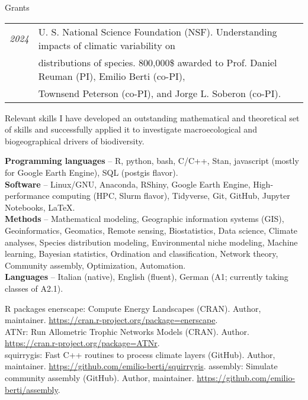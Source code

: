 \documentclass{resume} %
\begin{document}
\begin{rSection}{Grants}
\begin{tabular}{l l}
{\em 2024} & U. S. National Science Foundation (NSF). Understanding impacts of climatic variability on\\
           & distributions of species. 800,000\$ awarded to Prof. Daniel Reuman (PI), Emilio Berti (co-PI),\\
           & Townsend Peterson (co-PI), and Jorge L. Soberon (co-PI).
\end{tabular}
\end{rSection}

\begin{rSection}{Relevant skills}
I have developed an outstanding mathematical and theoretical set of skills and successfully applied it to
investigate macroecological and biogeographical drivers of biodiversity.

\textbf{Programming languages} – R, python, bash, C/C++, Stan, javascript (mostly for Google Earth Engine), SQL (postgis flavor).\\
\textbf{Software} – Linux/GNU, Anaconda, RShiny, Google Earth Engine, High-performance computing (HPC, Slurm flavor), Tidyverse, Git, GitHub, Jupyter Notebooks, \LaTeX.\\
\textbf{Methods} – Mathematical modeling, Geographic information systems (GIS), Geoinformatics, Geomatics, Remote sensing, Biostatistics, Data science, Climate analyses, Species distribution modeling, Environmental niche modeling, Machine learning, Bayesian statistics, Ordination and classification, Network theory,
Community assembly, Optimization, Automation.\\
\textbf{Languages} – Italian (native), English (fluent), German (A1; currently taking classes of A2.1).
\end{rSection}

\begin{rSection}{R packages}
enerscape: Compute Energy Landscapes (CRAN). Author, maintainer. \url{https://cran.r-project.org/package=enerscape}.\\
ATNr: Run Allometric Trophic Networks Models (CRAN). Author. \url{https://cran.r-project.org/package=ATNr}.\\
squirrygis: Fast C++ routines to process climate layers (GitHub). Author, maintainer. \url{https://github.com/emilio-berti/squirrygis}.
assembly: Simulate community assembly (GitHub). Author, maintainer. \url{https://github.com/emilio-berti/assembly}.
\end{rSection}
\end{document}
